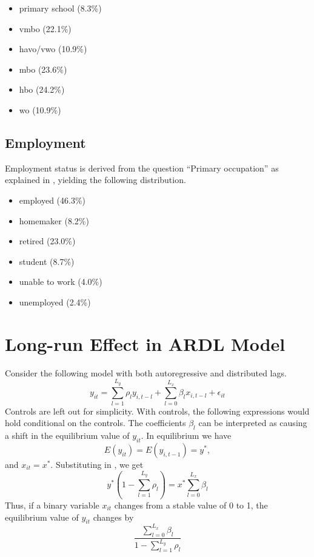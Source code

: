 \begin{itemize}[nolistsep]
    \item primary school (8.3\%)
    \item vmbo (22.1\%)
    \item havo/vwo (10.9\%)
    \item mbo (23.6\%)
    \item hbo (24.2\%)
    \item wo (10.9\%)
\end{itemize}

\section*{Employment}
Employment status is derived from the question ``Primary occupation'' as explained in ,
yielding the following distribution.

\begin{itemize}[nolistsep]
    \item employed (46.3\%)
    \item homemaker (8.2\%)
    \item retired (23.0\%)
    \item student (8.7\%)
    \item unable to work (4.0\%)
    \item unemployed (2.4\%)
\end{itemize}

\chapter{Long-run Effect in ARDL Model}
\label{chap:app:long_run_effect}
Consider the following model with both autoregressive and distributed lags.
\begin{equation}
    \label{eq:app:ardl_model}
    y_{it} = \sum_{l=1}^{L_y} \rho_l y_{i,t-l} + \sum_{l=0}^{L_x} \beta_l x_{i,t-l} + \epsilon_{it}
\end{equation}
Controls are left out for simplicity. With controls, the following expressions would hold conditional on the
controls.
The coefficients $\beta_l$ can be interpreted as causing a shift in the equilibrium value of $y_{it}$.
In equilibrium we have
\begin{equation}
    E(y_{it}) = E(y_{i,t-1}) = y^*,
\end{equation}
and $x_{it} = x^*$. Substituting in , we get
\begin{equation}
    y^* (1 - \sum_{l=1}^{L_y} \rho_l) = x^* \sum_{l=0}^{L_x} \beta_l
\end{equation}
Thus, if a binary variable $x_{it}$ changes from a stable value of  0 to 1, the equilibrium value of $y_{it}$ changes by
\begin{equation}
    \frac{\sum_{l=0}^{L_x} \beta_l}{1 - \sum_{l=1}^{L_y} \rho_l}
\end{equation}

